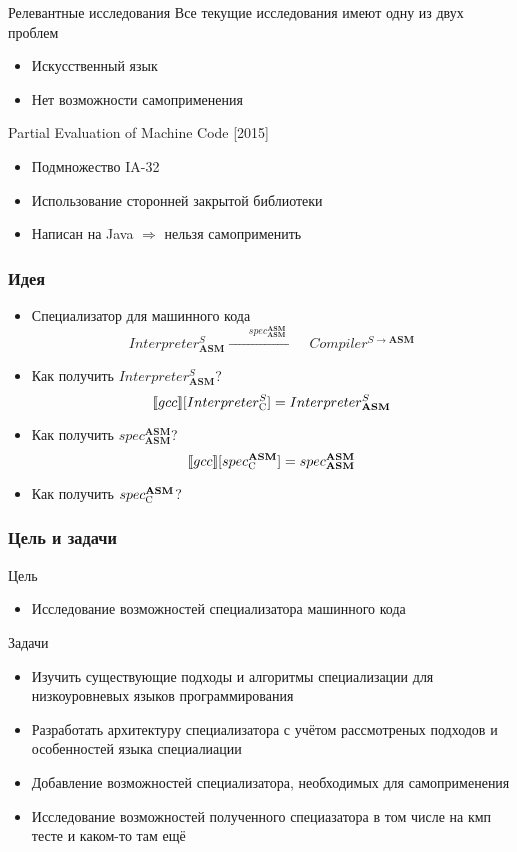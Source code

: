 \documentclass[demo]{beamer}
\begin{document}
\begin{frame}{Релевантные исследования}
  Все текущие исследования имеют одну из двух проблем
  \begin{itemize}
  \item Искусственный язык
    \vfill
  \item Нет возможности самоприменения
  \end{itemize}
  \vfill
  Partial Evaluation of Machine Code \hfill [2015]
    \begin{itemize}
    \item Подмножество IA-32
    \vfill
    \item Использование сторонней закрытой библиотеки
    \vfill
    \item \large Написан на Java $\Rightarrow$ нельзя самоприменить
  	\end{itemize}
\end{frame}

\begin{frame}\frametitle{Идея}
  \begin{itemize}
  \item {Специализатор для машинного кода
      $$Interpreter^{S}_{\mathbf{ASM}}
      \xrightarrow{\qquad spec^{ \mathbf{ASM}}_{\mathbf{ASM}}\qquad} Compiler^{S \to \mathbf{ASM}}$$
    }
    \vfill
  \item {Как получить $Interpreter^{S}_{\mathbf{ASM}}$?
      $$\llbracket gcc \rrbracket [Interpreter^{S}_{\textsc{C}}] =
      Interpreter^{S}_{\mathbf{ASM}}$$}
    \vfill
  \item {Как получить $spec^{\mathbf{ASM}}_{\mathbf{ASM}}$?
      $$\llbracket gcc \rrbracket [spec^{ \mathbf{ASM}}_{\textsc{C}}] =
      spec^{\mathbf{ASM}}_{\mathbf{ASM}}$$}
    \vfill
  \item{Как получить $spec^{\mathbf{ASM}}_{\textsc{C}}$?}
    \vfill
  \end{itemize}
\end{frame}

\begin{frame}\frametitle{Цель и задачи}
\begin{block}{Цель}
\begin{itemize}
\item Исследование возможностей специализатора машинного кода
\end{itemize}
\end{block}
\begin{block}{Задачи}
\begin{itemize}
\item Изучить существующие подходы и алгоритмы специализации для низкоуровневых языков программирования
\item Разработать архитектуру специализатора с учётом рассмотреных подходов и особенностей языка специалиации
\item Добавление возможностей специализатора, необходимых для самоприменения 
\item Исследование возможностей полученного специазатора в том числе на кмп тесте и каком-то там ещё
\end{itemize}
\end{block}
\end{frame}
\end{document}

